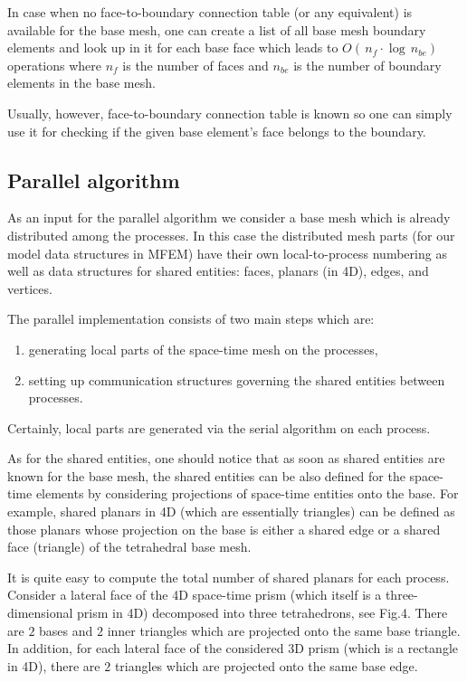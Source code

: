 \documentclass[12pt]{article}
\begin{document}
In case when no face-to-boundary connection table (or any equivalent) is available for the base mesh, one can create a list of all base mesh boundary elements and look up in it for each base face which leads to $O(\,n_{f} \cdot \log \, n_{be})$ operations where $n_{f}$ is the number of faces and $n_{be}$ is the number of boundary elements in the base mesh.

Usually, however, face-to-boundary connection table is known so one can simply use it for checking if the given base element's face belongs to the boundary.

\subsection{Parallel algorithm}
As an input for the parallel algorithm we consider a base mesh which is already distributed among the processes. In this case the distributed mesh parts (for our model data structures in MFEM) have their own local-to-process numbering as well as data structures for shared entities: faces, planars (in 4D), edges, and vertices.

The parallel implementation consists of two main steps which are:
\begin{enumerate}
	\item generating local parts of the space-time mesh on the processes, 
	\item setting up communication structures governing the shared entities between processes.
\end{enumerate}
Certainly, local parts are generated via the serial algorithm on each process.

As for the shared entities, one should notice that as soon as shared entities are known for the base mesh, the shared entities can be also defined for the space-time elements by considering projections of space-time entities onto the base. For example, shared planars in 4D (which are essentially triangles) can be defined as those planars whose projection on the base is either a shared edge or a shared face (triangle) of the tetrahedral base mesh. 

It is quite easy to compute the total number of shared planars for each process. Consider a lateral face of the 4D space-time prism (which itself is a three-dimensional prism in 4D) decomposed into three tetrahedrons, see Fig.4. There are $2$ bases and $2$ inner triangles which are projected onto the same base triangle. In addition, for each lateral face of the considered 3D prism (which is a rectangle in 4D), there are  $2$ triangles which are projected onto the same base edge.
\end{document}

